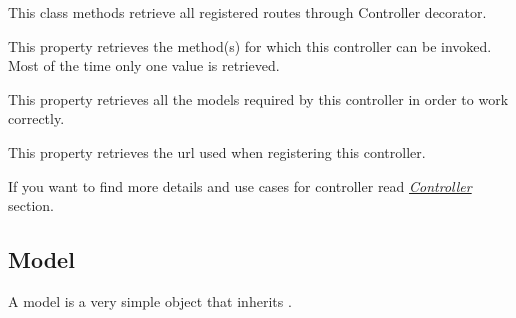 \documentclass[letterpaper,10pt,english]{sphinxmanual}
\begin{document}
\begin{fulllineitems}
\begin{fulllineitems}
\label{features/mvc:fantastico.mvc.controller_decorators.Controller.get_registered_routes}
This class methods retrieve all registered routes through Controller decorator.

\end{fulllineitems}


\begin{fulllineitems}
\label{features/mvc:fantastico.mvc.controller_decorators.Controller.method}
This property retrieves the method(s) for which this controller can be invoked. Most of the time only one value is
retrieved.

\end{fulllineitems}


\begin{fulllineitems}
\label{features/mvc:fantastico.mvc.controller_decorators.Controller.models}
This property retrieves all the models required by this controller in order to work correctly.

\end{fulllineitems}


\begin{fulllineitems}
\label{features/mvc:fantastico.mvc.controller_decorators.Controller.url}
This property retrieves the url used when registering this controller.

\end{fulllineitems}


\end{fulllineitems}


If you want to find more details and use cases for controller read {\hyperref[features/mvc:core-controller-section]{\emph{Controller}}} section.


\subsection{Model}
\label{features/mvc:model}
A model is a very simple object that inherits .
\end{document}
